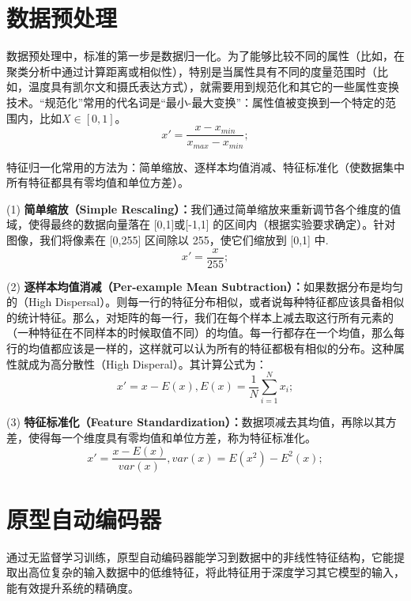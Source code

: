 \documentclass[oneside]{ZJUthesis}
\begin{document}
\section{数据预处理}
数据预处理中，标准的第一步是数据归一化。为了能够比较不同的属性（比如，在聚类分析中通过计算距离或相似性），特别是当属性具有不同的度量范围时（比如，温度具有凯尔文和摄氏表达方式），就需要用到规范化和其它的一些属性变换技术。``规范化''常用的代名词是``最小-最大变换''：属性值被变换到一个特定的范围内，比如$X \in [0,1]$。
\begin{equation}
	x'=\frac{x-x_{min}}{x_{max}-x_{min}};
\end{equation}

特征归一化常用的方法为：简单缩放、逐样本均值消减、特征标准化（使数据集中所有特征都具有零均值和单位方差）\cite{DBLP:journals/prl/AksoyH01}。

(1) \textbf{简单缩放（Simple Rescaling）：}我们通过简单缩放来重新调节各个维度的值域，使得最终的数据向量落在 [0,1]或[-1,1] 的区间内（根据实验要求确定）。针对图像，我们将像素在 [0,255] 区间除以 255，使它们缩放到 [0,1] 中.
\begin{equation}
	x'=\frac{x}{255};
\end{equation}

(2) \textbf{逐样本均值消减（Per-example Mean Subtraction）：}如果数据分布是均匀的（High Dispersal）。则每一行的特征分布相似，或者说每种特征都应该具备相似的统计特征。那么，对矩阵的每一行，我们在每个样本上减去取这行所有元素的（一种特征在不同样本的时候取值不同）的均值。每一行都存在一个均值，那么每行的均值都应该是一样的，这样就可以认为所有的特征都极有相似的分布。这种属性就成为高分散性（High Disperal）。其计算公式为：
\begin{equation}
	x'=x-E(x),E(x)=\frac{1}{N}\sum\limits_{i=1}^{N}{x_i};
\end{equation}

(3) \textbf{特征标准化（Feature Standardization）：}数据项减去其均值，再除以其方差，使得每一个维度具有零均值和单位方差，称为特征标准化。
\begin{equation}
	x'=\frac{x-E(x)}{var(x)},var(x)=E(x^2)-E^2(x);
\end{equation}

\section{原型自动编码器}
通过无监督学习训练，原型自动编码器能学习到数据中的非线性特征结构，它能提取出高位复杂的输入数据中的低维特征，将此特征用于深度学习其它模型的输入，能有效提升系统的精确度\cite{16}。
\end{document}
